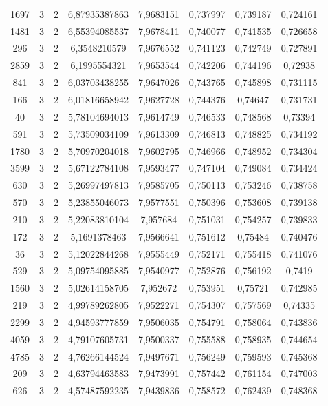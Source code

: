 \begin{longtable}{|c|c|c|c|c|c|c|c|}
1697 & 3 & 2 & 6,87935387863 & 7,9683151 & 0,737997 & 0,739187 & 0,724161 \\
1481 & 3 & 2 & 6,55394085537 & 7,9678411 & 0,740077 & 0,741535 & 0,726658 \\
296 & 3 & 2 & 6,3548210579 & 7,9676552 & 0,741123 & 0,742749 & 0,727891 \\
2859 & 3 & 2 & 6,1995554321 & 7,9653544 & 0,742206 & 0,744196 & 0,72938 \\
841 & 3 & 2 & 6,03703438255 & 7,9647026 & 0,743765 & 0,745898 & 0,731115 \\
166 & 3 & 2 & 6,01816658942 & 7,9627728 & 0,744376 & 0,74647 & 0,731731 \\
40 & 3 & 2 & 5,78104694013 & 7,9614749 & 0,746533 & 0,748568 & 0,73394 \\
591 & 3 & 2 & 5,73509034109 & 7,9613309 & 0,746813 & 0,748825 & 0,734192 \\
1780 & 3 & 2 & 5,70970204018 & 7,9602795 & 0,746966 & 0,748952 & 0,734304 \\
3599 & 3 & 2 & 5,67122784108 & 7,9593477 & 0,747104 & 0,749084 & 0,734424 \\
630 & 3 & 2 & 5,26997497813 & 7,9585705 & 0,750113 & 0,753246 & 0,738758 \\
570 & 3 & 2 & 5,23855046073 & 7,9577551 & 0,750396 & 0,753608 & 0,739138 \\
210 & 3 & 2 & 5,22083810104 & 7,957684 & 0,751031 & 0,754257 & 0,739833 \\
172 & 3 & 2 & 5,1691378463 & 7,9566641 & 0,751612 & 0,75484 & 0,740476 \\
36 & 3 & 2 & 5,12022844268 & 7,9555449 & 0,752171 & 0,755418 & 0,741076 \\
529 & 3 & 2 & 5,09754095885 & 7,9540977 & 0,752876 & 0,756192 & 0,7419 \\
1560 & 3 & 2 & 5,02614158705 & 7,952672 & 0,753951 & 0,75721 & 0,742985 \\
219 & 3 & 2 & 4,99789262805 & 7,9522271 & 0,754307 & 0,757569 & 0,74335 \\
2299 & 3 & 2 & 4,94593777859 & 7,9506035 & 0,754791 & 0,758064 & 0,743836 \\
4059 & 3 & 2 & 4,79107605731 & 7,9500337 & 0,755588 & 0,758935 & 0,744654 \\
4785 & 3 & 2 & 4,76266144524 & 7,9497671 & 0,756249 & 0,759593 & 0,745368 \\
209 & 3 & 2 & 4,63794463583 & 7,9473991 & 0,757442 & 0,761154 & 0,747003 \\
626 & 3 & 2 & 4,57487592235 & 7,9439836 & 0,758572 & 0,762439 & 0,748368 \\

\end{longtable}
